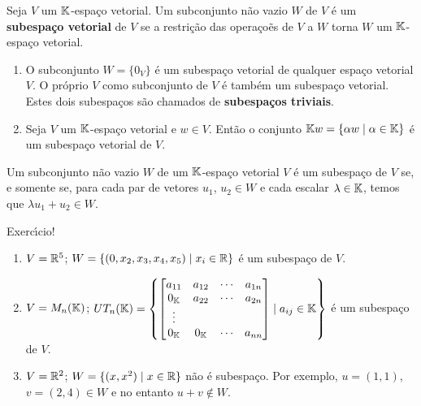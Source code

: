\begin{definicao}
	Seja $V$ um $\mathbb{K}$-espa\c{c}o vetorial. Um subconjunto n\~ao vazio $W$ de $V$ \'e um \textbf{subespa\c{c}o vetorial} de $V$ se a restri\c{c}\~ao das opera\c{c}o\~es de $V$ a $W$ torna $W$ um $\mathbb{K}$-espa\c{c}o vetorial.
\end{definicao}

\begin{exemplo}
	\begin{enumerate}[label={\alph*})]
		\item O subconjunto $W = \{0_V\}$ \'e um subespa\c{c}o vetorial de qualquer espa\c{c}o vetorial $V$. O pr\'oprio $V$ como subconjunto de $V$ \'e tamb\'em um subespa\c{c}o vetorial. Estes dois subespa\c{c}os s\~ao chamados de \textbf{subespa\c{c}os triviais}.
		\item Seja $V$ um $\mathbb{K}$-espa\c{c}o vetorial e $w \in V$. Ent\~ao o conjunto $\mathbb{K}w = \{\alpha w \mid \alpha \in \mathbb{K}\}$ \'e um subespa\c{c}o vetorial de $V$.
	\end{enumerate}
\end{exemplo}

\begin{teorema}
	Um subconjunto n\~ao vazio $W$ de um $\mathbb{K}$-espa\c{c}o vetorial $V$ \'e um subespa\c{c}o de $V$ se, e somente se, para cada par de vetores $u_1$, $u_2 \in W$ e cada escalar $\lambda \in \mathbb{K}$, temos que $\lambda u_1 + u_2 \in W$.
\end{teorema}
\begin{prova}
	Exerc{\'\i}cio!
\end{prova}

\begin{exemplo}
	\begin{enumerate}
		\item $V = \mathbb{R}^5$; $W = \{(0,x_2,x_3,x_4,x_5) \mid x_i \in \mathbb{R}\}$ \'e um subespa\c{c}o de $V$.
		\item $V = M_n(\mathbb{K})$; $UT_n(\mathbb{K}) = \left\{\begin{bmatrix}
			a_{11} & a_{12} & \cdots & a_{1n}\\
			0_{\mathbb{K}} & a_{22} & \cdots & a_{2n}\\
			\vdots\\
			0_{\mathbb{K}} & 0_{\mathbb{K}} & \cdots & a_{nn}
		\end{bmatrix} \mid a_{ij} \in \mathbb{K}\right\}$ \'e um subespa\c{c}o de $V$.
		\item $V = \mathbb{R}^2$; $W = \{(x,x^2) \mid x \in \mathbb{R}\}$ n\~ao \'e subespa\c{c}o. Por exemplo, $u = (1,1)$, $v = (2,4) \in W$ e no entanto $u + v \notin W$.
	\end{enumerate}
\end{exemplo}


